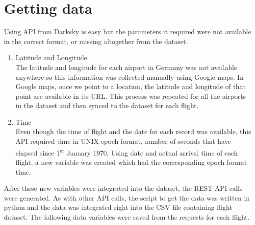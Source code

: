 \section{Getting data}
Using API from Darksky is easy but the parameters it required were not available in the correct format, or missing altogether from the dataset. 
\begin{enumerate}
    \item Latitude and Longitude
    \\ The latitude and longitude for each airport in Germany was not available anywhere so this information was collected manually using Google maps. In Google maps, once we point to a location, the latitude and longitude of that point are available in its URL. This process was repeated for all the airports in the dataset and then synced to the dataset for each flight.
    \item Time
    \\Even though the time of flight and the date for each record was available, this API required time in UNIX epoch format, number of seconds that have elapsed since 1\textsuperscript{st} January 1970. Using date and actual arrival time of each flight, a new variable was created which had the corresponding epoch format time.
\end{enumerate}

After these new variables were integrated into the dataset, the REST API calls were generated. As with other API calls, the script to get the data was written in python and the data was integrated right into the CSV file containing flight dataset. The following data variables were saved from the requests for each flight.

